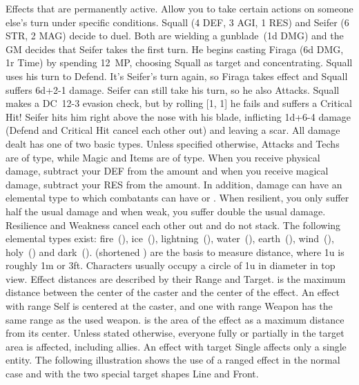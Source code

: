  Effects that are permanently active. \ofgap
{} Allow you to take certain actions on someone else's turn under specific conditions.
%
\vfill
%
{
	Squall (4 DEF, 3 AGI, 1 RES) and Seifer (6 STR, 2 MAG) decide to duel.
	Both are wielding a gunblade~(1d DMG) and the GM decides that Seifer takes the first turn.
	He begins casting Firaga (6d DMG, 1r Time) by spending 12~MP, choosing Squall as target and concentrating.
	Squall uses his turn to Defend.
	It's Seifer's turn again, so Firaga takes effect and Squall suffers \mbox{6d+2-1} damage. 
	Seifer can still take his turn, so he also Attacks. 
	Squall makes a \mbox{DC 12-3} evasion check, but by rolling [1, 1] he fails and suffers a Critical Hit! 
	Seifer hits him right above the nose with his blade, inflicting \mbox{1d+6-4} damage (Defend and Critical Hit cancel each other out) and leaving a scar.
}
%
\clearpage
%
All damage dealt has one of two basic types.
Unless specified otherwise, Attacks and Techs are of  type, while Magic and Items are of  type.
When you receive physical damage, subtract your DEF from the amount and when you receive magical damage, subtract your RES from the amount.
In addition, damage can have an elemental type to which combatants can have  or . 
When resilient, you only suffer half the usual damage and when weak, you suffer double the usual damage. 
Resilience and Weakness cancel each other out and do not stack.
The following elemental types exist: fire~(\fire), ice~(\ice), lightning~(\lightning), water~(\water), earth~(\earth), wind~(\wind), holy~(\holy) and dark~(\dark).
%
\vfill
%
 (shortened ) are the basis to measure distance, where 1u is roughly 1m or 3ft.
Characters usually occupy a circle of 1u in diameter in top view. 
Effect distances are described by their Range and Target.
 is the maximum distance between the center of the caster and the center of the effect. 
An effect with range Self is centered at the caster, and one with range Weapon has the same range as the used weapon.
 is the area of the effect as a maximum distance from its center. Unless stated otherwise, everyone fully or partially in the target area is affected, including allies.
An effect with target Single affects only a single entity.
The following illustration shows the use of a ranged effect in the normal case and with the two special target shapes Line and Front. 
%
